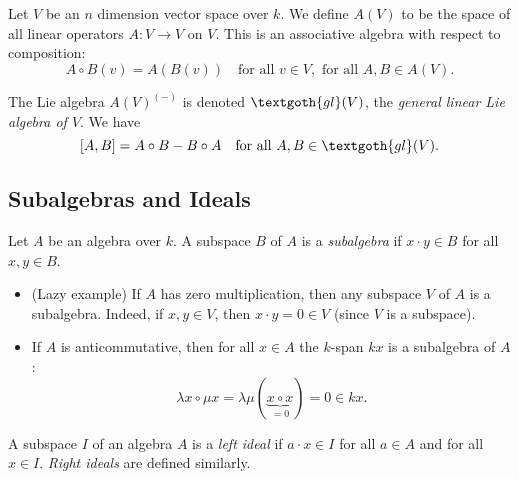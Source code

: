 \begin{definition}
	Let $V$ be an $n$ dimension vector space over $k$. We define $A(V)$ to be the space of all linear operators $A : V \to V$ on $V$. This is an associative algebra with respect to composition:
	\[
		A \circ B(v) = A(B(v)) \quad \text{for all } v \in V, \text{ for all } A, B \in A(V).
	\]
\end{definition}

\begin{definition}
	The Lie algebra $A(V)^{(-)}$ is denoted $\textgoth{gl}(V)$, the \emph{general linear Lie algebra of $V$}. We have
	\[
		[A, B] = A \circ B - B \circ A \quad \text{for all } A, B \in \textgoth{gl}(V).
	\]
\end{definition}

\subsection{Subalgebras and Ideals}
\begin{definition}
	Let $A$ be an algebra over $k$. A subspace $B$ of $A$ is a \emph{subalgebra} if $x \cdot y \in B$ for all $x, y \in B$.
\end{definition}

\begin{example}\hfill
	\begin{itemize}
		\item (Lazy example) If $A$ has zero multiplication, then any subspace $V$ of $A$ is a subalgebra. Indeed, if $x, y \in V$, then $x \cdot y = 0 \in V$ (since $V$ is a subspace).
		\item If $A$ is anticommutative, then for all $x \in A$ the $k$-span $kx$ is a subalgebra of $A$:
		\[
			\lambda x \circ \mu x = \lambda\mu(\underbrace{x \circ x}_{= 0}) = 0 \in kx.
		\]
	\end{itemize}
\end{example}

\begin{definition}
	A subspace $I$ of an algebra $A$ is a \emph{left ideal} if $a \cdot x \in I$ for all $a \in A$ and for all $x \in I$. \emph{Right ideals} are defined similarly.
\end{definition}

